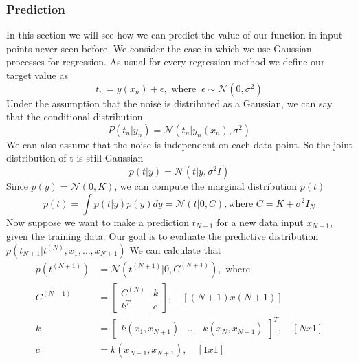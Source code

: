 \documentclass[../main.tex]{subfiles}
\begin{document}
\subsubsection{Prediction}
In this section we will see how we can predict the value of our function in input points never seen before. We consider the case in which we use Gaussian processes for regression. As usual for every regression method we define our target value as
\begin{equation*}
    t_n = y(x_n) + \epsilon,\text{ where } \ \epsilon \sim \mathcal{N}(0, \sigma^2)
\end{equation*}
Under the assumption that the noise is distributed as a Gaussian, we can say that the conditional distribution
\begin{equation}
    P(t_n|y_n) = \mathcal{N}(t_n|y_n(x_n), \sigma^2)
\end{equation}
We can also assume that the noise is independent on each data point. So the joint distribution of t is still Gaussian
\begin{equation}
    p(t|y) = \mathcal{N}(t|y, \sigma^2 I)
\end{equation}
Since $p(y)=\mathcal{N}(0, K)$, we can compute the marginal distribution $p(t)$
\begin{equation}
    p(t) = \int p(t|y)p(y)dy = \mathcal{N}(t|0,C),\text{where } C = K + \sigma^2 I_N
\end{equation}
Now suppose we want to make a prediction $t_{N+1}$ for a new data input $x_{N+1}$, given the training data. Our goal is to evaluate the predictive distribution $p(t_{N+1}|t^{(N)},x_1,\dots,x_{N+1})$\footnotemark {}
We can calculate that
\begin{align*}
    p(t^{(N+1)}) & = \mathcal{N}(t^{(N+1)}|0,C^{(N+1)}), \text{ where}                                      \\
    C^{(N+1)}    & =
    \begin{bmatrix}
        C^{(N)} & k \\
        k^T     & c
    \end{bmatrix}, \quad [(N+1) x (N+1)]                                                                    \\
    k            & = \begin{bmatrix} k(x_1, x_{N+1}) & \dots & k(x_N, x_{N+1}) \end{bmatrix}^T, \quad [Nx1] \\
    c            & = k(x_{N+1},x_{N+1}), \quad [1x1]
\end{align*}
\end{document}
